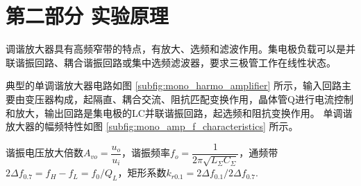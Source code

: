 \documentclass[UTF8]{ctexart}
\begin{document}
\section{第二部分 \texorpdfstring{\quad}{} 实验原理}

调谐放大器具有高频窄带的特点，有放大、选频和滤波作用。集电极负载可以是并联谐振回路、耦合谐振回路或集中选频滤波器，要求三极管工作在线性状态。

典型的单调谐放大器电路如图 \ref{subfig:mono_harmo_amplifier} 所示，输入回路主要由变压器构成，起隔直、耦合交流、阻抗匹配变换作用，晶体管Q进行电流控制和放大，输出回路是集电极的LC并联谐振回路，起选频和阻抗变换作用。
单调谐放大器的幅频特性如图 \ref{subfig:mono_amp_f_characteristics} 所示。

谐振电压放大倍数$A_{vo}=\dfrac{u_o}{u_i}$，谐振频率$f_o=\dfrac{1}{2\pi\sqrt{L_{\Sigma}C_{\Sigma}}}$，通频带$2\Delta f_{0.7}=f_H-f_L=f_0/Q_L$，矩形系数$k_{r0.1}=2\Delta f_{0.1}/2\Delta f_{0.7}$.
\end{document}
